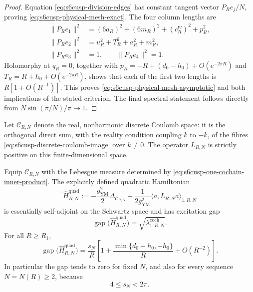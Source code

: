\begin{proof}
Equation \eqref{eq:s6cusp-division-edges} has constant tangent vector
\(P_Re_j/N\), proving \eqref{eq:s6cusp-physical-mesh-exact}.  The four
column lengths are
\begin{align*}
 \lVert P_Re_1\rVert^2
 &=(6a_R)^2+(6m_R)^2+(c_R^{\mathrm{re}})^2+p_R^2,\\
 \lVert P_Re_2\rVert^2
 &=u_R^2+T_R^2+a_R^2+m_R^2,\\
 \lVert P_Re_3\rVert^2&=1,\qquad
 \lVert P_Re_4\rVert^2=1.
\end{align*}
Holomorphy at \(q_R=0\), together with
\(p_R=-R+(d_0-h_0)+O(e^{-2\pi R})\) and
\(T_R=R+h_0+O(e^{-2\pi R})\), shows that each of the first two lengths is
\(R[1+O(R^{-1})]\).  This proves
\eqref{eq:s6cusp-physical-mesh-asymptotic} and both implications of the
stated criterion.  The final spectral statement follows directly from
\(N\sin(\pi/N)/\pi\to1\).
\end{proof}

Let \(\mathscr C_{R,N}\) denote the real, nonharmonic discrete Coulomb
space: it is the orthogonal direct sum, with the reality condition coupling
\(k\) to \(-k\), of the fibres
\eqref{eq:s6cusp-discrete-coulomb-image} over \(k\ne0\).
The operator \(L_{R,N}\) is strictly positive on this finite-dimensional
space.

\begin{theorem}
\label{thm:s6cusp-gaussian-quantization}
Equip \(\mathscr C_{R,N}\) with the Lebesgue measure determined by
\eqref{eq:s6cusp-one-cochain-inner-product}.  The explicitly defined
quadratic Hamiltonian
\begin{equation}\label{eq:s6cusp-quadratic-hamiltonian}
 \widehat H^{\mathrm{quad}}_{R,N}
 :=
 -\frac{g_{\mathrm{YM}}^2}{2}\Delta_{\mathscr C_{R,N}}
 +\frac1{2g_{\mathrm{YM}}^2}
 \langle a,L_{R,N}a\rangle_{1,R,N}
\end{equation}
is essentially self-adjoint on the Schwartz space and has excitation gap
\begin{equation}\label{eq:s6cusp-quadratic-gap-exact}
 \operatorname{gap}
 \bigl(\widehat H^{\mathrm{quad}}_{R,N}\bigr)
 =\sqrt{\lambda_{1,R,N}^{\mathrm{coch}}}.
\end{equation}
For all \(R\ge R_1\),
\begin{equation}\label{eq:s6cusp-quadratic-gap-asymptotic}
 \operatorname{gap}
 \bigl(\widehat H^{\mathrm{quad}}_{R,N}\bigr)
 =
 \frac{s_N}{R}
 \left[
 1+\frac{\min\{d_0-h_0,-h_0\}}{R}
 +O(R^{-2})
 \right].
\end{equation}
In particular the gap tends to zero for fixed \(N\), and also for every
sequence \(N=N(R)\ge2\), because
\begin{equation}\label{eq:s6cusp-sN-uniform-bounds}
 4\le s_N<2\pi.
\end{equation}
\end{theorem}

